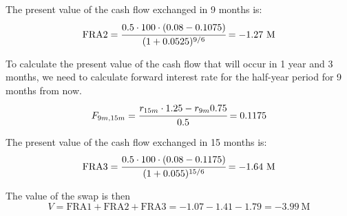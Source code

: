 \documentclass{beamer}
\begin{document}
\begin{frame}{}
The present value of the cash flow exchanged in 9 months is:
\begin{equation*}
\text{FRA2}=\cfrac{0.5\cdot100\cdot(0.08-0.1075)}{(1+0.0525)^{9/6}}=-1.27~\text{M}
\end{equation*}

To calculate the present value of the cash flow that will occur in 1 year and 3 months, we need to calculate forward interest rate for the half-year period for 9 months from now.
\begin{equation*}
F_{9m,15m} = \cfrac{r_{15m}\cdot1.25-r_{9m}0.75}{0.5}=0.1175
\end{equation*}

The present value of the cash flow exchanged in 15 months is:
\begin{equation*}
\text{FRA3}= \cfrac{0.5\cdot100\cdot(0.08-0.1175)}{(1+0.055)^{15/6}}=-1.64~\text{M}
\end{equation*}

The value of the swap is then 
\begin{equation*}
V = \text{FRA1}+\text{FRA2}+\text{FRA3} = -1.07-1.41-1.79=-3.99~\text{M}
\end{equation*}
\end{frame}

%
%
%
\end{document}
